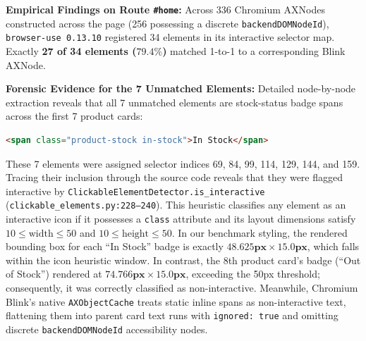 \documentclass[11pt,a4paper]{article}
\begin{document}
\textbf{Empirical Findings on Route \texttt{\#home}:}
Across 336 Chromium AXNodes constructed across the page (256 possessing a discrete \texttt{backendDOMNodeId}), \texttt{browser-use 0.13.10} registered 34 elements in its interactive selector map. Exactly \textbf{27 of 34 elements ($79.4\%$)} matched 1-to-1 to a corresponding Blink AXNode.

\textbf{Forensic Evidence for the 7 Unmatched Elements:}
Detailed node-by-node extraction reveals that all 7 unmatched elements are stock-status badge spans across the first 7 product cards:
\begin{lstlisting}[language=HTML]
<span class="product-stock in-stock">In Stock</span>
\end{lstlisting}
These 7 elements were assigned selector indices 69, 84, 99, 114, 129, 144, and 159. Tracing their inclusion through the source code reveals that they were flagged interactive by \texttt{ClickableElementDetector.is\_interactive} (\texttt{clickable\_elements.py:228--240}). This heuristic classifies any element as an interactive icon if it possesses a \texttt{class} attribute and its layout dimensions satisfy $10 \le \text{width} \le 50$ and $10 \le \text{height} \le 50$. In our benchmark styling, the rendered bounding box for each ``In Stock'' badge is exactly $\mathbf{48.625\text{px} \times 15.0\text{px}}$, which falls within the icon heuristic window. In contrast, the 8th product card's badge (``Out of Stock'') rendered at $\mathbf{74.766\text{px} \times 15.0\text{px}}$, exceeding the 50px threshold; consequently, it was correctly classified as non-interactive. Meanwhile, Chromium Blink's native \texttt{AXObjectCache} treats static inline spans as non-interactive text, flattening them into parent card text runs with \texttt{ignored: true} and omitting discrete \texttt{backendDOMNodeId} accessibility nodes.
\end{document}
